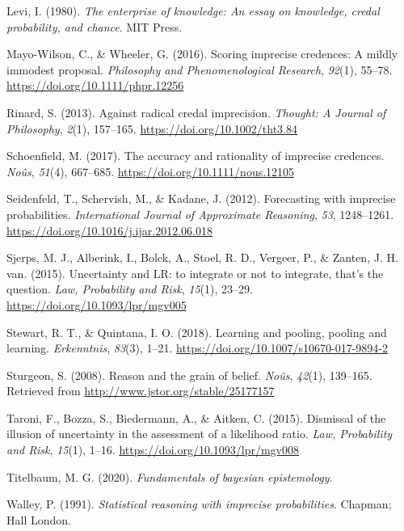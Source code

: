 \documentclass[
  10pt,
  dvipsnames,enabledeprecatedfontcommands]{scrartcl}
\newlength{\cslhangindent}
\newlength{\cslentryspacingunit} %
\newenvironment{CSLReferences}[2] %
 {%
  \setlength{\parindent}{0pt}
  \ifodd #1
  \let\oldpar\par
  \def\par{\hangindent=\cslhangindent\oldpar}
  \fi
  \setlength{\parskip}{#2\cslentryspacingunit}
 }%
 {}
\begin{document}
\begin{CSLReferences}{1}{0}
\leavevmode{}%
Levi, I. (1980). \emph{The enterprise of knowledge: An essay on
knowledge, credal probability, and chance}. MIT Press.

\leavevmode{}%
Mayo-Wilson, C., \& Wheeler, G. (2016). Scoring imprecise credences: A
mildly immodest proposal. \emph{Philosophy and Phenomenological
Research}, \emph{92}(1), 55--78.
\url{https://doi.org/10.1111/phpr.12256}

\leavevmode{}%
Rinard, S. (2013). Against radical credal imprecision. \emph{Thought: A
Journal of Philosophy}, \emph{2}(1), 157--165.
\url{https://doi.org/10.1002/tht3.84}

\leavevmode{}%
Schoenfield, M. (2017). The accuracy and rationality of imprecise
credences. \emph{Noûs}, \emph{51}(4), 667--685.
\url{https://doi.org/10.1111/nous.12105}

\leavevmode{}%
Seidenfeld, T., Schervish, M., \& Kadane, J. (2012). Forecasting with
imprecise probabilities. \emph{International Journal of Approximate
Reasoning}, \emph{53}, 1248--1261.
\url{https://doi.org/10.1016/j.ijar.2012.06.018}

\leavevmode{}%
Sjerps, M. J., Alberink, I., Bolck, A., Stoel, R. D., Vergeer, P., \&
Zanten, J. H. van. (2015). {Uncertainty and LR: to integrate or not to
integrate, that's the question}. \emph{Law, Probability and Risk},
\emph{15}(1), 23--29. \url{https://doi.org/10.1093/lpr/mgv005}

\leavevmode{}%
Stewart, R. T., \& Quintana, I. O. (2018). Learning and pooling, pooling
and learning. \emph{Erkenntnis}, \emph{83}(3), 1--21.
\url{https://doi.org/10.1007/s10670-017-9894-2}

\leavevmode{}%
Sturgeon, S. (2008). Reason and the grain of belief. \emph{No{û}s},
\emph{42}(1), 139--165. Retrieved from
\url{http://www.jstor.org/stable/25177157}

\leavevmode{}%
Taroni, F., Bozza, S., Biedermann, A., \& Aitken, C. (2015). {Dismissal
of the illusion of uncertainty in the assessment of a likelihood ratio}.
\emph{Law, Probability and Risk}, \emph{15}(1), 1--16.
\url{https://doi.org/10.1093/lpr/mgv008}

\leavevmode{}%
Titelbaum, M. G. (2020). \emph{Fundamentals of bayesian epistemology}.

\leavevmode{}%
Walley, P. (1991). \emph{Statistical reasoning with imprecise
probabilities}. Chapman; Hall London.

\end{CSLReferences}
\end{document}

